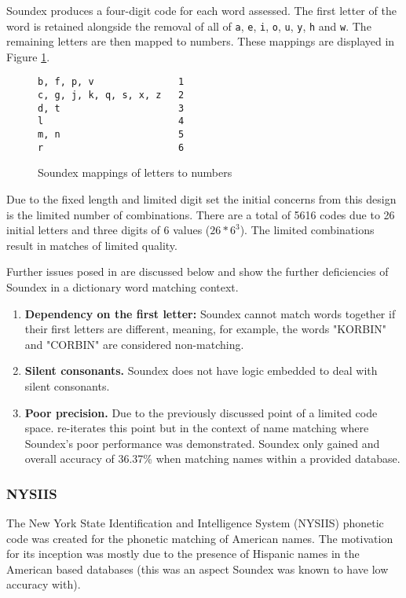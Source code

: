 Soundex produces a four-digit code for each word assessed.
The first letter of the word is retained alongside the removal of all of \verb|a|, \verb|e|, \verb|i|, \verb|o|, \verb|u|, \verb|y|, \verb|h| and \verb|w|. The remaining letters are then mapped to numbers. These mappings are displayed in Figure \ref{fig:soundexMap}.

\begin{figure}[h!]
    \centering
    \begin{BVerbatim}
b, f, p, v               1
c, g, j, k, q, s, x, z   2
d, t                     3
l                        4
m, n                     5
r                        6
    \end{BVerbatim}

    \caption{Soundex mappings of letters to numbers}
    \label{fig:soundexMap}
\end{figure}

Due to the fixed length and limited digit set the initial concerns from this design is the limited number of combinations. There are a total of 5616 codes due to 26 initial letters and three digits of 6 values ($26 * 6^3$).
The limited combinations result in matches of limited quality.

Further issues posed in \cite{patman2001soundex} are discussed below and show the further deficiencies of Soundex in a dictionary word matching context. 

\begin{enumerate}
    \item \textbf{Dependency on the first letter:} Soundex cannot match words together if their first letters are different, meaning, for example, the words "KORBIN" and "CORBIN" are considered non-matching. 

    \item \textbf{Silent consonants.} Soundex does not have logic embedded to deal with silent consonants.

    \item \textbf{Poor precision.} Due to the previously discussed point of a limited code space. \cite{patman2001soundex} re-iterates this point but in the context of name matching where Soundex's poor performance was demonstrated. Soundex only gained and overall accuracy of 36.37\% when matching names within a provided database.
\end{enumerate}

\subsubsection*{NYSIIS}
\label{sec:nysiis}
The New York State Identification and Intelligence System (NYSIIS) phonetic code was created for the phonetic matching of American names. The motivation for its inception was mostly due to the presence of Hispanic names in the American based databases (this was an aspect Soundex was known to have low accuracy with). 

